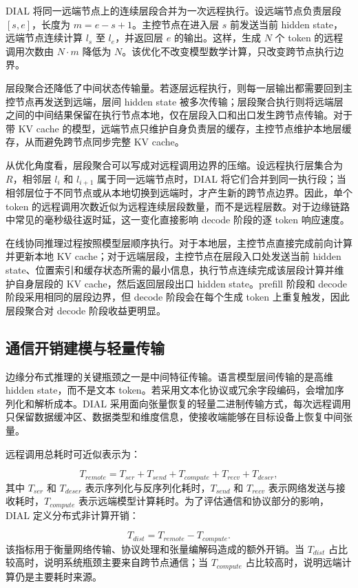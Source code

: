 \documentclass[10pt,a4paper,twocolumn]{ctexart}
\begin{document}
DIAL 将同一远端节点上的连续层段合并为一次远程执行。设远端节点负责层段 \([s,e]\)，长度为 \(m=e-s+1\)。主控节点在进入层 \(s\) 前发送当前 hidden state，远端节点连续计算 \(l_s\) 至 \(l_e\)，并返回层 \(e\) 的输出。这样，生成 \(N\) 个 token 的远程调用次数由 \(N\cdot m\) 降低为 \(N\)。该优化不改变模型数学计算，只改变跨节点执行边界。

层段聚合还降低了中间状态传输量。若逐层远程执行，则每一层输出都需要回到主控节点再发送到远端，层间 hidden state 被多次传输；层段聚合执行则将远端层之间的中间结果保留在执行节点本地，仅在层段入口和出口发生跨节点传输。对于带 KV cache 的模型，远端节点只维护自身负责层的缓存，主控节点维护本地层缓存，从而避免跨节点同步完整 KV cache。

从优化角度看，层段聚合可以写成对远程调用边界的压缩。设远程执行层集合为 \(R\)，相邻层 \(l_i\) 和 \(l_{i+1}\) 属于同一远端节点时，DIAL 将它们合并到同一执行段；当相邻层位于不同节点或从本地切换到远端时，才产生新的跨节点边界。因此，单个 token 的远程调用次数近似为远程连续层段数量，而不是远程层数。对于边缘链路中常见的毫秒级往返时延，这一变化直接影响 decode 阶段的逐 token 响应速度。

在线协同推理过程按照模型层顺序执行。对于本地层，主控节点直接完成前向计算并更新本地 KV cache；对于远端层段，主控节点在层段入口处发送当前 hidden state、位置索引和缓存状态所需的最小信息，执行节点连续完成该层段计算并维护自身层段的 KV cache，然后返回层段出口 hidden state。prefill 阶段和 decode 阶段采用相同的层段边界，但 decode 阶段会在每个生成 token 上重复触发，因此层段聚合对 decode 阶段收益更明显。

\subsection{通信开销建模与轻量传输}

边缘分布式推理的关键瓶颈之一是中间特征传输。语言模型层间传输的是高维 hidden state，而不是文本 token。若采用文本化协议或冗余字段编码，会增加序列化和解析成本。DIAL 采用面向张量恢复的轻量二进制传输方式，每次远程调用只保留数据缓冲区、数据类型和维度信息，使接收端能够在目标设备上恢复中间张量。

远程调用总耗时可近似表示为：

\[
T_{remote}=T_{ser}+T_{send}+T_{compute}+T_{recv}+T_{deser},
\]
其中 \(T_{ser}\) 和 \(T_{deser}\) 表示序列化与反序列化耗时，\(T_{send}\) 和 \(T_{recv}\) 表示网络发送与接收耗时，\(T_{compute}\) 表示远端模型计算耗时。为了评估通信和协议部分的影响，DIAL 定义分布式非计算开销：

\[
T_{dist}=T_{remote}-T_{compute}.
\]
该指标用于衡量网络传输、协议处理和张量编解码造成的额外开销。当 \(T_{dist}\) 占比较高时，说明系统瓶颈主要来自跨节点通信；当 \(T_{compute}\) 占比较高时，说明远端计算仍是主要耗时来源。
\end{document}

